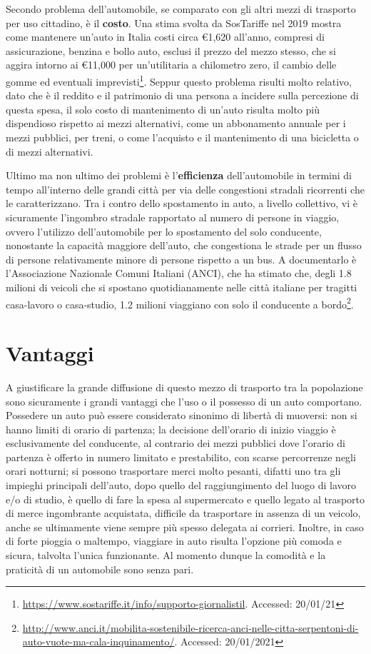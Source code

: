 Secondo problema dell'automobile, se comparato con gli altri mezzi di trasporto per uso cittadino, è il \textbf{costo}. Una stima svolta da SosTariffe nel 2019 mostra come mantenere un'auto in Italia costi circa €1,620 all'anno, compresi di assicurazione, benzina e bollo auto, esclusi il prezzo del mezzo stesso, che si aggira intorno ai €11,000 per un'utilitaria a chilometro zero, il cambio delle gomme ed eventuali imprevisti\footnote{\url{https://www.sostariffe.it/info/supporto-giornalistil}. Accessed: 20/01/21}. Seppur questo problema risulti molto relativo, dato che è il reddito e il patrimonio di una persona a incidere sulla percezione di questa spesa, il solo costo di mantenimento di un'auto risulta molto più dispendioso rispetto ai mezzi alternativi, come un abbonamento annuale per i mezzi pubblici, per treni, o come l'acquisto e il mantenimento di una bicicletta o di mezzi alternativi.

Ultimo ma non ultimo dei problemi è l'\textbf{efficienza} dell'automobile in termini di tempo all'interno delle grandi città per via delle congestioni stradali ricorrenti che le caratterizzano. Tra i contro dello spostamento in auto, a livello collettivo, vi è sicuramente l'ingombro stradale rapportato al numero di persone in viaggio, ovvero l'utilizzo dell'automobile per lo spostamento del solo conducente, nonostante la capacità maggiore dell'auto, che congestiona le strade per un flusso di persone relativamente minore di persone rispetto a un bus. A documentarlo è l'Associazione Nazionale Comuni Italiani (ANCI), che ha stimato che, degli 1.8 milioni di veicoli che si spostano quotidianamente nelle città italiane per tragitti casa-lavoro o casa-studio, 1.2 milioni viaggiano con solo il conducente a bordo\footnote{\url{http://www.anci.it/mobilita-sostenibile-ricerca-anci-nelle-citta-serpentoni-di-auto-vuote-ma-cala-inquinamento/}. Accessed: 20/01/2021}.

\section{Vantaggi}

A giustificare la grande diffusione di questo mezzo di trasporto tra la popolazione sono sicuramente i grandi vantaggi che l'uso o il possesso di un auto comportano. Possedere un auto può essere considerato sinonimo di libertà di muoversi: non si hanno limiti di orario di partenza; la decisione dell'orario di inizio viaggio è esclusivamente del conducente, al contrario dei mezzi pubblici dove l'orario di partenza è offerto in numero limitato e prestabilito, con scarse percorrenze negli orari notturni; si possono trasportare merci molto pesanti, difatti uno tra gli impieghi principali dell'auto, dopo quello del raggiungimento del luogo di lavoro e/o di studio, è quello di fare la spesa al supermercato e quello legato al trasporto di merce ingombrante acquistata, difficile da trasportare in assenza di un veicolo, anche se ultimamente viene sempre più spesso delegata ai corrieri. Inoltre, in caso di forte pioggia o maltempo, viaggiare in auto risulta l'opzione più comoda e sicura, talvolta l'unica funzionante. Al momento dunque la comodità e la praticità di un automobile sono senza pari.


